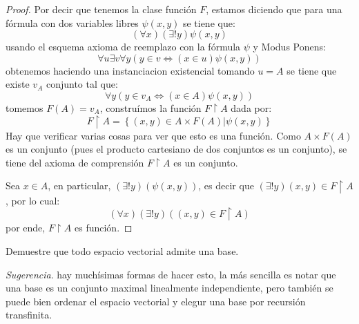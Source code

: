 \documentclass[12pt]{article}
\newcounter{it}
\theoremstyle{largebreak}
\begin{document}
    \begin{proof}
        Por decir que tenemos la clase función $F$, estamos diciendo que para una fórmula con dos variables libres $\psi(x,y)$ se tiene que:
        \begin{equation*}
            (\forall x)(\exists!y)\psi(x,y)
        \end{equation*}
        usando el esquema axioma de reemplazo con la fórmula $\psi$ y Modus Ponens:
        \begin{equation*}
            \forall u\exists v\forall y(y\in v\iff(x\in u)\psi(x,y))
        \end{equation*}
        obtenemos haciendo una instanciacion existencial tomando $u=A$ se tiene que existe $v_A$ conjunto tal que:
        \begin{equation*}
            \forall y(y\in v_A\iff(x\in A)\psi(x,y))
        \end{equation*}
        tomemos $F(A)=v_A$, construímos la función $F\upharpoonright A$ dada por:
        \begin{equation*}
            F\upharpoonright A=\left\{(x,y)\in A\times F(A) \Big|\psi(x,y) \right\}
        \end{equation*}
        Hay que verificar varias cosas para ver que esto es una función. Como $A\times F(A)$ es un conjunto (pues el producto cartesiano de dos conjuntos es un conjunto), se tiene del axioma de comprensión $F\upharpoonright A$ es un conjunto.

        Sea $x\in A$, en particular, $(\exists !y)(\psi(x,y))$, es decir que $(\exists!y)(x,y)\in F\upharpoonright A$, por lo cual:
        \begin{equation*}
            (\forall x)(\exists!y)((x,y)\in F\upharpoonright A)
        \end{equation*}
        por ende, $F\upharpoonright A$ es función.
    \end{proof}

    \begin{excer}
        Demuestre que todo espacio vectorial admite una base.

        \textit{Sugerencia}. hay muchísimas formas de hacer esto, la más sencilla es notar que una base es un conjunto maximal linealmente independiente, pero también se puede bien ordenar el espacio vectorial y elegur una base por recursión transfinita.
    \end{excer}
\end{document}
